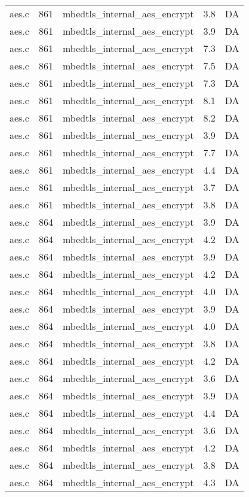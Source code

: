 \begin{table}[h!]
\begin{tabular}{lrlrr}
aes.c& 861&mbedtls\_internal\_aes\_encrypt&3.8 &DA\\
aes.c& 861&mbedtls\_internal\_aes\_encrypt&3.9 &DA\\
aes.c& 861&mbedtls\_internal\_aes\_encrypt&7.3 &DA\\
aes.c& 861&mbedtls\_internal\_aes\_encrypt&7.5 &DA\\
aes.c& 861&mbedtls\_internal\_aes\_encrypt&7.3 &DA\\
aes.c& 861&mbedtls\_internal\_aes\_encrypt&8.1 &DA\\
aes.c& 861&mbedtls\_internal\_aes\_encrypt&8.2 &DA\\
aes.c& 861&mbedtls\_internal\_aes\_encrypt&3.9 &DA\\
aes.c& 861&mbedtls\_internal\_aes\_encrypt&7.7 &DA\\
aes.c& 861&mbedtls\_internal\_aes\_encrypt&4.4 &DA\\
aes.c& 861&mbedtls\_internal\_aes\_encrypt&3.7 &DA\\
aes.c& 861&mbedtls\_internal\_aes\_encrypt&3.8 &DA\\
aes.c& 864&mbedtls\_internal\_aes\_encrypt&3.9 &DA\\
aes.c& 864&mbedtls\_internal\_aes\_encrypt&4.2 &DA\\
aes.c& 864&mbedtls\_internal\_aes\_encrypt&3.9 &DA\\
aes.c& 864&mbedtls\_internal\_aes\_encrypt&4.2 &DA\\
aes.c& 864&mbedtls\_internal\_aes\_encrypt&4.0 &DA\\
aes.c& 864&mbedtls\_internal\_aes\_encrypt&3.9 &DA\\
aes.c& 864&mbedtls\_internal\_aes\_encrypt&4.0 &DA\\
aes.c& 864&mbedtls\_internal\_aes\_encrypt&3.8 &DA\\
aes.c& 864&mbedtls\_internal\_aes\_encrypt&4.2 &DA\\
aes.c& 864&mbedtls\_internal\_aes\_encrypt&3.6 &DA\\
aes.c& 864&mbedtls\_internal\_aes\_encrypt&3.9 &DA\\
aes.c& 864&mbedtls\_internal\_aes\_encrypt&4.4 &DA\\
aes.c& 864&mbedtls\_internal\_aes\_encrypt&3.6 &DA\\
aes.c& 864&mbedtls\_internal\_aes\_encrypt&4.2 &DA\\
aes.c& 864&mbedtls\_internal\_aes\_encrypt&3.8 &DA\\
aes.c& 864&mbedtls\_internal\_aes\_encrypt&4.3 &DA\\

\end{tabular}
\end{table}

